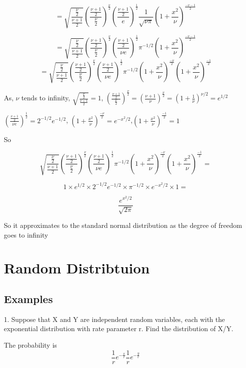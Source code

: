 \documentclass{article}
\begin{document}
$$={\sqrt{\frac{{\frac{\nu}{2}}}{\frac{\nu+1}{2}}}(\frac{\frac{\nu+1}{2}}{\frac{\nu}{2}})^{\frac{\nu}{2}} (\frac{\frac{\nu+1}{2}}{e})^{\frac{1}{2}} } \frac{1}{\sqrt{\nu \pi}} {(1+\frac{x^2}{\nu})^{\frac{-\nu-1}{2}}} $$

$$={\sqrt{\frac{{\frac{\nu}{2}}}{\frac{\nu+1}{2}}}(\frac{\frac{\nu+1}{2}}{\frac{\nu}{2}})^{\frac{\nu}{2}} (\frac{\frac{\nu+1}{2}}{\nu e})^{\frac{1}{2}} } {{ \pi}}^{-1/2} {(1+\frac{x^2}{\nu})^{\frac{-\nu-1}{2}}} $$
$$={\sqrt{\frac{{\frac{\nu}{2}}}{\frac{\nu+1}{2}}}(\frac{\frac{\nu+1}{2}}{\frac{\nu}{2}})^{\frac{\nu}{2}} (\frac{\frac{\nu+1}{2}}{\nu e})^{\frac{1}{2}} } {{ \pi}}^{-1/2} {(1+\frac{x^2}{\nu})^{\frac{-\nu}{2}}} {(1+\frac{x^2}{\nu})^{\frac{-1}{2}}} $$

As, $\nu$ tends to infinity, $\sqrt{\frac{{\frac{\nu}{2}}}{\frac{\nu+1}{2}}} = 1$, $(\frac{\frac{\nu+1}{2}}{\frac{\nu}{2}})^{\frac{\nu}{2}} = (\frac{{\nu+1}}{{\nu}})^{\frac{\nu}{2}}=(1+\frac{1}{\nu})^{\nu/2} = e^{1/2}$

$(\frac{\frac{\nu+1}{2}}{\nu e})^{\frac{1}{2}} = 2^{-1/2} e^{-1/2}$, ${(1+\frac{x^2}{\nu})^{\frac{-\nu}{2}}} = e^{-x^2/2}$,${(1+\frac{x^2}{\nu})^{\frac{-1}{2}}}  = 1$


So 

$${\sqrt{\frac{{\frac{\nu}{2}}}{\frac{\nu+1}{2}}}(\frac{\frac{\nu+1}{2}}{\frac{\nu}{2}})^{\frac{\nu}{2}} (\frac{\frac{\nu+1}{2}}{\nu e})^{\frac{1}{2}} } {{ \pi}}^{-1/2} {(1+\frac{x^2}{\nu})^{\frac{-\nu}{2}}} {(1+\frac{x^2}{\nu})^{\frac{-1}{2}}} = $$

$$1\times e^{1/2} \times2^{-1/2} e^{-1/2} \times {{ \pi}}^{-1/2} \times  e^{-x^2/2} \times 1=$$

$$\frac{e^{x^2/2}}{\sqrt{2\pi}}$$

So it approximates to the standard normal distribution as the degree of freedom goes to infinity

\section{Random Distribtuion}

\subsection{Examples}

1. Suppose that X and Y are independent random variables, each with the exponential distribution with rate parameter r. Find the distribution of X/Y.

The probability is 
$$\frac{1}{r} e^{-\frac{x}{r}} \frac{1}{r} e^{-\frac{y}{r}} $$
\end{document}
